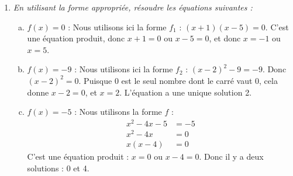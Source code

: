 \documentclass[12pt]{article}
\begin{document}
\begin{exercice}
\begin{enumerate}
    \item \emph{En utilisant la forme appropriée, résoudre les équations suivantes :}

      \begin{enumerate}[(a)]
        \item $f(x)=0$ :
          Nous utilisons ici la forme $f_1$ :
            $\left( x+1 \right)\left( x-5 \right) = 0$.
          C'est une équation produit, donc $x+1=0$ ou $x-5=0$, et donc $x=-1$ ou $x=5$.

        \item $f(x)=-9$ : Nous utilisons ici la forme $f_2$ : $\left( x-2 \right)^2-9=-9$. Donc $\left( x-2 \right)^2=0$. Puisque 0 est le seul nombre dont le carré vaut 0, cela donne $x-2=0$, et $x=2$. L'équation a une unique solution 2.
        \item $f(x)=-5$ : Nous utilisons la forme $f$ :
          \begin{align*}
            x^2-4x-5 &= -5\\
            x^2-4x&=0\\
            x\left( x-4 \right)&=0
          \end{align*}
          C'est une équation produit : $x=0$ ou $x-4=0$. Donc il y a deux solutions : 0 et 4.
      \end{enumerate}
  \end{enumerate}
\end{exercice}

\pagebreak
\end{document}
